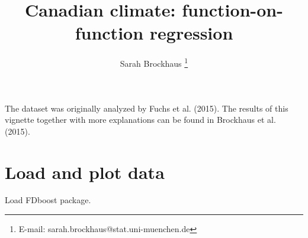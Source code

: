 \documentclass{article}\usepackage[]{graphicx}\usepackage[]{color}
\begin{document}

\title{Canadian climate: function-on-function regression}
\author{Sarah Brockhaus 
\thanks{E-mail: sarah.brockhaus@stat.uni-muenchen.de}}
\date{}
\maketitle

The dataset was originally analyzed by Fuchs et al. (2015). 
The results of this vignette together with more explanations can be found in Brockhaus et al. (2015).  




\section{Load and plot data}
Load FDboost package.
\end{document}
